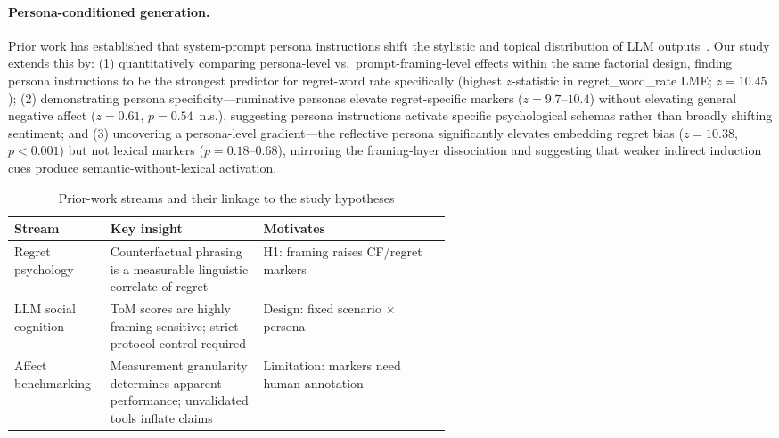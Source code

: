 \documentclass[11pt]{article}
\begin{document}
\paragraph{Persona-conditioned generation.}
Prior work has established that system-prompt persona instructions shift the stylistic and topical distribution of LLM outputs~\citep{shanahan2023roleplay, salewski2024impersonation}. Our study extends this by: (1) quantitatively comparing persona-level vs.\ prompt-framing-level effects within the same factorial design, finding persona instructions to be the strongest predictor for regret-word rate specifically (highest $z$-statistic in regret\_word\_rate LME; $z=10.45$); (2) demonstrating persona specificity---ruminative personas elevate regret-specific markers ($z=9.7$--$10.4$) without elevating general negative affect ($z=0.61$, $p=0.54$~n.s.), suggesting persona instructions activate specific psychological schemas rather than broadly shifting sentiment; and (3) uncovering a persona-level gradient---the reflective persona significantly elevates embedding regret bias ($z=10.38$, $p<0.001$) but not lexical markers ($p=0.18$--$0.68$), mirroring the framing-layer dissociation and suggesting that weaker indirect induction cues produce semantic-without-lexical activation.

\begin{table}[t]
\caption{Prior-work streams and their linkage to the study hypotheses}
\label{tab:litmap}
\scriptsize\centering
\setlength{\tabcolsep}{3pt}
\begin{tabularx}{\linewidth}{@{}>{\RaggedRight\arraybackslash}p{0.22\linewidth}
>{\RaggedRight\arraybackslash}p{0.35\linewidth}
>{\RaggedRight\arraybackslash}X@{}}
\toprule
\rowcolor{tableheader}
\textbf{Stream} & \textbf{Key insight} & \textbf{Motivates} \\
\midrule
Regret psychology & Counterfactual phrasing is a measurable linguistic correlate of regret & H1: framing raises CF/regret markers \\
LLM social cognition & ToM scores are highly framing-sensitive; strict protocol control required & Design: fixed scenario × persona \\
Affect benchmarking & Measurement granularity determines apparent performance; unvalidated tools inflate claims & Limitation: markers need human annotation \\
\bottomrule
\end{tabularx}
\end{table}
\setlength{\tabcolsep}{3pt}
\end{document}
